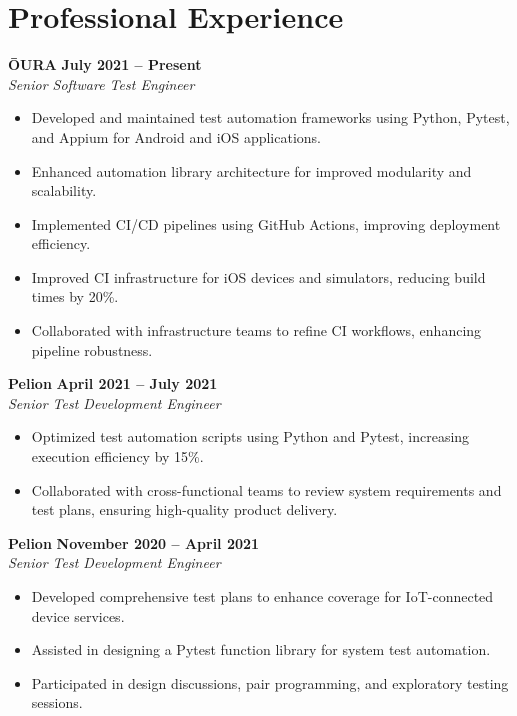 \documentclass[12pt]{article}
\begin{document}
\section*{Professional Experience}\label{experience}

\textbf{ŌURA} \hfill \textbf{July 2021 – Present} \\
\textit{Senior Software Test Engineer} \\
\begin{itemize}
    \item Developed and maintained test automation frameworks using Python, Pytest, and Appium for Android and iOS applications.
    \item Enhanced automation library architecture for improved modularity and scalability.
    \item Implemented CI/CD pipelines using GitHub Actions, improving deployment efficiency.
    \item Improved CI infrastructure for iOS devices and simulators, reducing build times by 20\%.
    \item Collaborated with infrastructure teams to refine CI workflows, enhancing pipeline robustness.
\end{itemize}

\textbf{Pelion} \hfill \textbf{April 2021 – July 2021} \\
\textit{Senior Test Development Engineer} \\
\begin{itemize}
    \item Optimized test automation scripts using Python and Pytest, increasing execution efficiency by 15\%.
    \item Collaborated with cross-functional teams to review system requirements and test plans, ensuring high-quality product delivery.
\end{itemize}

\textbf{Pelion} \hfill \textbf{November 2020 – April 2021} \\
\textit{Senior Test Development Engineer} \\
\begin{itemize}
    \item Developed comprehensive test plans to enhance coverage for IoT-connected device services.
    \item Assisted in designing a Pytest function library for system test automation.
    \item Participated in design discussions, pair programming, and exploratory testing sessions.
\end{itemize}
\end{document}

